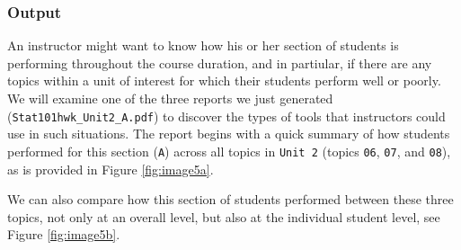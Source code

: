 \documentclass{article}\usepackage[]{graphicx}\usepackage[]{color}
\numberwithin{equation}{section} %
\begin{document}
\subsubsection{Output}

An instructor might want to know how his or her section of students is performing throughout the course duration, and in partiular, if there are any topics within a unit of interest for which their students perform well or poorly. We will examine one of the three reports we just generated (\texttt{Stat101hwk\_Unit2\_A.pdf}) to discover the types of tools that instructors could use in such situations. The report begins with a quick summary of how students performed for this section (\texttt{A}) across all topics in \texttt{Unit 2} (topics \texttt{06}, \texttt{07}, and \texttt{08}), as is provided in Figure \ref{fig:image5a}.

\begin{center}
\captionsetup{width=0.65\textwidth}
\label{fig:image5a}
\end{center}

We can also compare how this section of students performed between these three topics, not only at an overall level, but also at the individual student level, see Figure \ref{fig:image5b}.

\begin{center}
\captionsetup{width=0.65\textwidth}
\label{fig:image5b}
\end{center}
\end{document}
